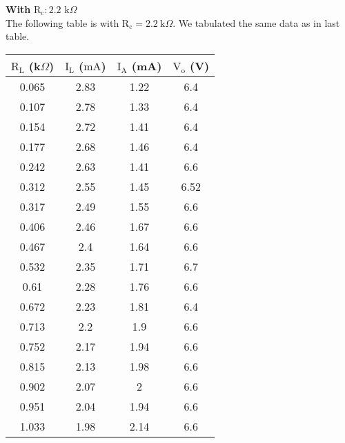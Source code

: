 \documentclass[12pt]{article}
\begin{document}
\noindent
\textbf{With} $\mathrm{R_c}: 2.2$ $\mathrm{k}\Omega$\\[0.3cm]
The following table is with \( \mathrm{R_c} = 2.2 \ \mathrm{k} \Omega\). We tabulated the same data as in last table.
\begin{longtable}{|c|c|c|c|} 
        \hline 
        $\text{R}_\text{L}$ (k$\Omega$) & {$\text{I}_\text{L}$ ($\mathrm{mA}$)} & $\text{I}_\text{A}$ (mA) & $\text{V}_\text{o}$ (V) \\ \hline \hline
        
        
        
        0.065       & 2.83      & 1.22    & 6.4     \\ \hline
        0.107       & 2.78      & 1.33    & 6.4     \\ \hline
        0.154       & 2.72      & 1.41    & 6.4     \\ \hline
        0.177       & 2.68      & 1.46    & 6.4     \\ \hline
        0.242       & 2.63      & 1.41    & 6.6     \\ \hline
        0.312       & 2.55      & 1.45    & 6.52    \\ \hline
        0.317       & 2.49      & 1.55    & 6.6     \\ \hline
        0.406       & 2.46      & 1.67    & 6.6     \\ \hline
        0.467       & 2.4       & 1.64    & 6.6     \\ \hline
        0.532       & 2.35      & 1.71    & 6.7     \\ \hline
        0.61        & 2.28      & 1.76    & 6.6     \\ \hline
        0.672       & 2.23      & 1.81    & 6.4     \\ \hline
        0.713       & 2.2       & 1.9     & 6.6     \\ \hline
        0.752       & 2.17      & 1.94    & 6.6     \\ \hline
        0.815       & 2.13      & 1.98    & 6.6     \\ \hline
        0.902       & 2.07      & 2       & 6.6     \\ \hline
        0.951       & 2.04      & 1.94    & 6.6     \\ \hline
        1.033       & 1.98      & 2.14    & 6.6     \\ \hline
\end{longtable}
\end{document}
